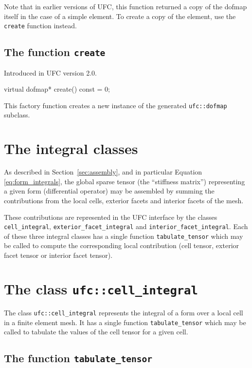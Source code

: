 Note that in earlier versions of UFC, this function returned a copy of
the dofmap itself in the case of a simple element. To create a copy
of the element, use the \texttt{create} function instead.

\subsection{The function \texttt{create}}
Introduced in UFC version 2.0.

\begin{code}
virtual dofmap* create() const = 0;
\end{code}

This factory function creates a new instance of the generated
\texttt{ufc::dofmap} subclass.

\section{The integral classes}

As described in Section~\ref{sec:assembly}, and in particular Equation
\eqref{eq:form_integrals}, the global sparse tensor
(the ``stiffness matrix'') representing a given form (differential
operator) may be assembled by summing the contributions from the local
cells, exterior facets and interior facets of the mesh.

These contributions are represented in the UFC interface by the
classes \texttt{cell\_integral}, \texttt{exterior\_facet\_integral}
and \texttt{interior\_facet\_integral}. Each of these three integral
classes has a single function \texttt{tabulate\_tensor} which may be
called to compute the corresponding local contribution (cell tensor,
exterior facet tensor or interior facet tensor).

\section{The class \texttt{ufc::cell\_integral}}

The class \texttt{ufc::cell\_integral} represents the integral of a
form over a local cell in a finite element mesh. It has a single
function \texttt{tabulate\_tensor} which may be called to tabulate the
values of the cell tensor for a given cell.

\subsection{The function \texttt{tabulate\_tensor}}


